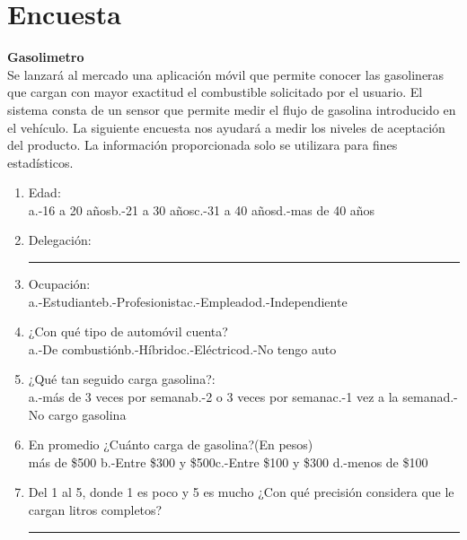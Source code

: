 \section{Encuesta} \label{FactibilidadOperativa}
\textbf{Gasolimetro}
\\Se lanzará al mercado una aplicación móvil que permite conocer las gasolineras que cargan con mayor exactitud el combustible solicitado por el usuario. El sistema consta de un sensor que permite medir el flujo de gasolina introducido en el vehículo.
La siguiente encuesta nos ayudará a medir los niveles de aceptación del producto. La información proporcionada solo se utilizara para fines estadísticos.
\\
\begin{enumerate}
	\item Edad: \\ a.-16 a 20 años\hspace{1cm}b.-21 a 30 años\hspace{1cm}c.-31 a 40 años\hspace{1cm}d.-mas de 40 años
	\item Delegación: \rule{20mm}{0.1mm}
	\item Ocupación:\\ a.-Estudiante\hspace{1cm}b.-Profesionista\hspace{1cm}c.-Empleado\hspace{1cm}d.-Independiente
	\item ¿Con qué tipo de automóvil cuenta?\\ a.-De combustión\hspace{1cm}b.-Híbrido\hspace{1cm}c.-Eléctrico\hspace{1cm}d.-No tengo auto
	\item ¿Qué tan seguido carga gasolina?:\\ a.-más de 3 veces por semana\hspace{1cm}b.-2 o 3 veces por semana\hspace{1cm}c.-1 vez a la semana\hspace{1cm}d.-No cargo gasolina
	\item En promedio ¿Cuánto carga de gasolina?(En pesos)\\más de \$500 \hspace{1cm}b.-Entre \$300 y \$500\hspace{1cm}c.-Entre \$100 y \$300 \hspace{1cm}d.-menos de \$100
	\item Del 1 al 5, donde 1 es poco y 5 es mucho ¿Con qué precisión considera que le cargan litros completos? \rule{20mm}{0.1mm}

\end{enumerate}
